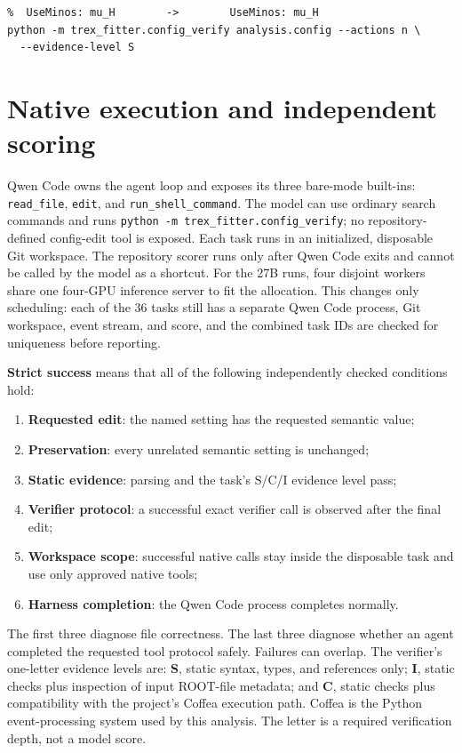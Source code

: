 \documentclass[10pt]{article}
\newcommand{\code}[1]{\texttt{#1}}
\begin{document}
\begin{verbatim}
%  UseMinos: mu_H        ->        UseMinos: mu_H
python -m trex_fitter.config_verify analysis.config --actions n \
  --evidence-level S
\end{verbatim}

\section{Native execution and independent scoring}
Qwen Code owns the agent loop and exposes its three bare-mode built-ins:
\code{read\_file}, \code{edit}, and \code{run\_shell\_command}.  The model can
use ordinary search commands and runs
\code{python -m trex\_fitter.config\_verify}; no repository-defined config-edit
tool is exposed.  Each task runs in an initialized, disposable Git workspace.
The repository scorer runs only after Qwen Code exits and cannot be called by
the model as a shortcut.
For the 27B runs, four disjoint workers share one four-GPU inference server to
fit the allocation.  This changes only scheduling: each of the 36 tasks still
has a separate Qwen Code process, Git workspace, event stream, and score, and
the combined task IDs are checked for uniqueness before reporting.

\textbf{Strict success} means that all of the following independently checked
conditions hold:
\begin{enumerate}
  \item \textbf{Requested edit}: the named setting has the requested semantic value;
  \item \textbf{Preservation}: every unrelated semantic setting is unchanged;
  \item \textbf{Static evidence}: parsing and the task's S/C/I evidence level pass;
  \item \textbf{Verifier protocol}: a successful exact verifier call is observed
        after the final edit;
  \item \textbf{Workspace scope}: successful native calls stay inside the
        disposable task and use only approved native tools;
  \item \textbf{Harness completion}: the Qwen Code process completes normally.
\end{enumerate}
The first three diagnose file correctness.  The last three diagnose whether an
agent completed the requested tool protocol safely.  Failures can overlap.
The verifier's one-letter evidence levels are: \textbf{S}, static syntax,
types, and references only; \textbf{I}, static checks plus inspection of input
ROOT-file metadata; and \textbf{C}, static checks plus compatibility with the
project's Coffea execution path.  Coffea is the Python event-processing system
used by this analysis.  The letter is a required verification depth, not a
model score.
\end{document}
